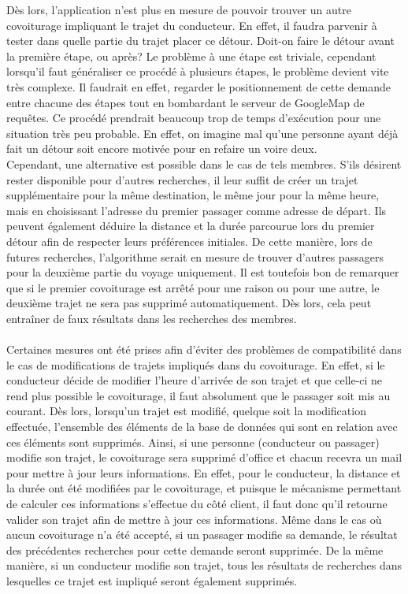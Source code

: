 \documentclass[12pt, a4paper, oneside]{article}
\begin{document}
{{        \indent Dès lors, l'application n'est plus en mesure de pouvoir trouver un autre covoiturage impliquant le trajet du conducteur. En effet, il faudra parvenir à tester dans quelle partie du trajet placer ce détour. Doit-on faire le détour avant la première étape, ou après? Le problème à une étape est triviale, cependant lorsqu'il faut généraliser ce procédé à plusieurs étapes, le problème devient vite très complexe. Il faudrait en effet, regarder le positionnement de cette demande entre chacune des étapes tout en bombardant le serveur de GoogleMap de requêtes. Ce procédé prendrait beaucoup trop de temps d'exécution pour une situation très peu probable. En effet, on imagine mal qu'une personne ayant déjà fait un détour soit encore motivée pour en refaire un voire deux.\\
        \indent Cependant, une alternative est possible dans le cas de tels membres. S'ils désirent rester disponible pour d'autres recherches, il leur suffit de créer un trajet supplémentaire pour la même destination, le même jour pour la même heure, mais en choisissant l'adresse du premier passager comme adresse de départ. Ils peuvent également déduire la distance et la durée parcourue lors du premier détour afin de respecter leurs préférences initiales. De cette manière, lors de futures recherches, l'algorithme serait en mesure de trouver d'autres passagers pour la deuxième partie du voyage uniquement. Il est toutefois bon de remarquer que si le premier covoiturage est arrêté pour une raison ou pour une autre, le deuxième trajet ne sera pas supprimé automatiquement. Dès lors, cela peut entraîner de faux résultats dans les recherches des membres.\\\\
        \indent Certaines mesures ont été prises afin d'éviter des problèmes de compatibilité dans le cas de modifications de trajets impliqués dans du covoiturage. En effet, si le conducteur décide de modifier l'heure d'arrivée de son trajet et que celle-ci ne rend plus possible le covoiturage, il faut absolument que le passager soit mis au courant. Dès lors, lorsqu'un trajet est modifié, quelque soit la modification effectuée, l'ensemble des éléments de la base de données qui sont en relation avec ces éléments sont supprimés. Ainsi, si une personne (conducteur ou passager) modifie son trajet, le covoiturage sera supprimé d'office et chacun recevra un mail pour mettre à jour leurs informations. En effet, pour le conducteur, la distance et la durée ont été modifiées par le covoiturage, et puisque le mécanisme permettant de calculer ces informations s'effectue du côté client, il faut donc qu'il retourne valider son trajet afin de mettre à jour ces informations. Même dans le cas où aucun covoiturage n'a été accepté, si un passager modifie sa demande, le résultat des précédentes recherches pour cette demande seront supprimée. De la même manière, si un conducteur modifie son trajet, tous les résultats de recherches dans lesquelles ce trajet est impliqué seront également supprimés.
        
}}
\end{document}
